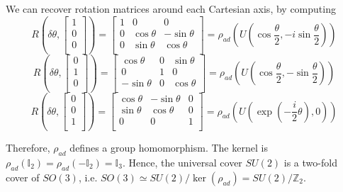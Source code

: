    
    We can recover rotation matrices around each Cartesian axis, by computing 
    \begin{equation*}
        R(\delta \theta, \begin{bmatrix} 1 \\ 0 \\ 0 \\ \end{bmatrix} ) = \begin{bmatrix}
            1 & 0 & 0 \\ 0 & \cos \theta & - \sin \theta \\ 0 & \sin \theta & \cos \theta \\
        \end{bmatrix} = \rho_{ad} (U(\cos \frac{\theta}{2} , -i \sin \frac{\theta}{2}))
    \end{equation*}
    \begin{equation*}
        R(\delta \theta, \begin{bmatrix} 0 \\ 1 \\ 0 \\ \end{bmatrix} ) = \begin{bmatrix}
            \cos \theta & 0 & \sin \theta \\ 0 & 1 & 0 \\  -\sin \theta & 0 & \cos \theta \\
        \end{bmatrix} = \rho_{ad} (U(\cos \frac{\theta}{2} , - \sin \frac{\theta}{2}))
    \end{equation*}
    \begin{equation*}
        R(\delta \theta, \begin{bmatrix} 0 \\ 0 \\ 1 \\ \end{bmatrix} ) = \begin{bmatrix}
            \cos \theta & - \sin \theta & 0 \\ \sin \theta & \cos \theta & 0 \\ 0 & 0 & 1 \\
        \end{bmatrix} = \rho_{ad} (U(\exp(-\frac{i}{2} \theta), 0))
    \end{equation*}

    Therefore, $\rho_{ad}$ defines a group homomorphism. The kernel is $\rho_{ad} (\mathbb I_2) = \rho_{ad} (- \mathbb I_2) = \mathbb I_3$. Hence, the universal cover $SU(2)$ is a two-fold cover of $SO(3)$, i.e. $SO(3) \simeq SU(2) / \ker (\rho_{ad}) = SU(2) / \mathbb Z_2$.

